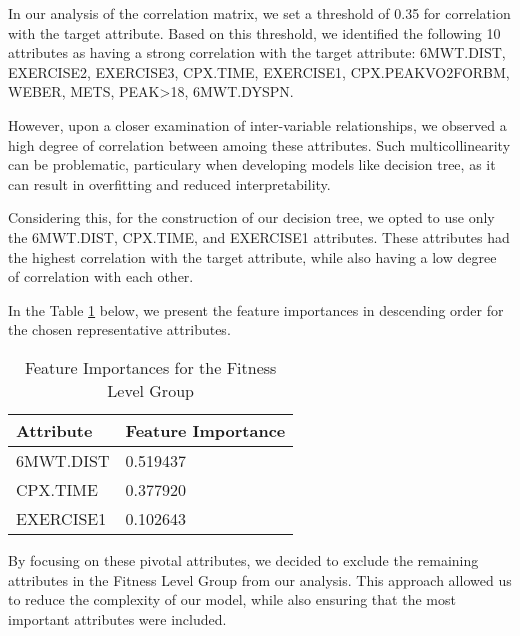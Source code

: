 In our analysis of the correlation matrix, we set a threshold of 0.35 for correlation with the target attribute. Based on this threshold, we identified the following 10 attributes as having a strong correlation with the target attribute: 6MWT.DIST, EXERCISE2, EXERCISE3, CPX.TIME, EXERCISE1, CPX.PEAKVO2FORBM, WEBER, METS, PEAK>18, 6MWT.DYSPN. 

However, upon a closer examination of inter-variable relationships, we observed a high degree of correlation between amoing these attributes. Such multicollinearity can be problematic, particulary when developing models like decision tree, as it can result in overfitting and reduced interpretability.

Considering this, for the construction of our decision tree, we opted to use only the 6MWT.DIST, CPX.TIME, and EXERCISE1 attributes. These attributes had the highest correlation with the target attribute, while also having a low degree of correlation with each other.

In the Table \ref{tab: fitness level group feature importances} below, we present the feature importances in descending order for the chosen representative attributes.

\begin{table}[H]
    \centering
    \caption{Feature Importances for the Fitness Level Group}
    \label{tab: fitness level group feature importances}
    \begin{adjustbox}{center}
    \begin{tabular}{|p{4.5cm}|p{10cm}|}
    \hline
    \textbf{Attribute} & \textbf{Feature Importance} \\ \hline
    6MWT.DIST & 0.519437 \\
    CPX.TIME & 0.377920 \\
    EXERCISE1 & 0.102643 \\ \hline
    \end{tabular}
    \end{adjustbox}
\end{table}

By focusing on these pivotal attributes, we decided to exclude the remaining attributes in the Fitness Level Group from our analysis. This approach allowed us to reduce the complexity of our model, while also ensuring that the most important attributes were included.




